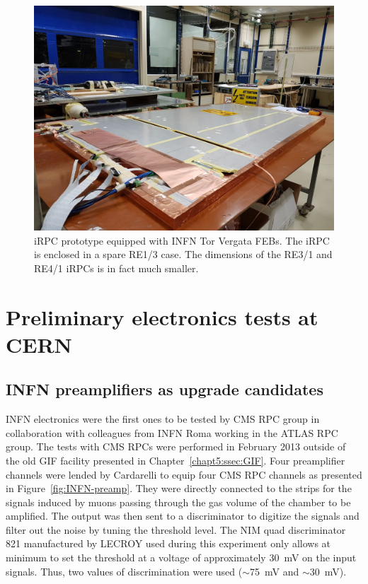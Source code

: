	\begin{figure}[H]
		\centering
		\includegraphics[width = 0.8\linewidth]{fig/chapt6/INFN-FEB-iRPC.png}
		\caption{\label{fig:INFN-iRPC} iRPC prototype equipped with INFN Tor Vergata FEBs. The iRPC is enclosed in a spare RE1/3 case. The dimensions of the RE3/1 and RE4/1 iRPCs is in fact much smaller.}
    \end{figure}

\section{Preliminary electronics tests at CERN}
\label{chapt6:sec:Preliminary}

	\subsection{INFN preamplifiers as upgrade candidates}
	\label{chapt6:ssec:INFN-Prelim}
	
	INFN electronics were the first ones to be tested by CMS RPC group in collaboration with colleagues from INFN Roma working in the ATLAS RPC group. The tests with CMS RPCs were performed in February 2013 outside of the old GIF facility presented in Chapter~\ref{chapt5:ssec:GIF}. Four preamplifier channels were lended by Cardarelli to equip four CMS RPC channels as presented in Figure~\ref{fig:INFN-preamp}. They were directly connected to the strips for the signals induced by muons passing through the gas volume of the chamber to be amplified. The output was then sent to a discriminator to digitize the signals and filter out the noise by tuning the threshold level. The NIM quad discriminator 821 manufactured by LECROY used during this experiment only allows at minimum to set the threshold at a voltage of approximately \SI{30}{mV} on the input signals. Thus, two values of discrimination were used ($\sim$\SI{75}{mV} and $\sim$\SI{30}{mV}).
	
